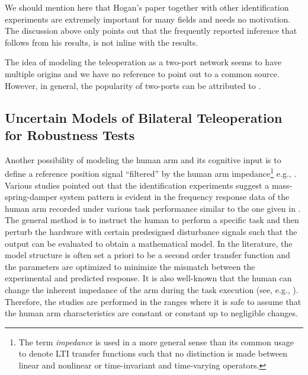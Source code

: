 We should mention here that Hogan's paper together with other identification experiments are extremely important for many
fields and needs no motivation. The discussion above only points out that the frequently reported inference that follows from 
his results, is not inline with the results. 

The idea of modeling the teleoperation as a two-port network seems to have multiple origins and we have no reference to 
point out to a common source. However, in general, the popularity of two-ports can be attributed to 
\cite{andersonspong,nieslotine,rajuphd,hannaford89,yokokohjiyoshikawa}. 



\subsection{Uncertain Models of Bilateral Teleoperation for Robustness Tests}\label{sec:lit:uncmodel}

Another possibility of modeling the human arm and its cognitive input is to define a reference position signal \enquote{filtered} by the 
human arm impedance\footnote{The term \emph{impedance} is used in a more general sense than its common usage to denote
LTI transfer functions such that no distinction is made between linear and nonlinear or time-invariant and time-varying 
operators.} e.g., \cite{leelee,kazeroonitsay}. Various studies pointed out that the identification experiments suggest a 
mass-spring-damper system pattern is evident in the frequency response data of the human arm recorded under various task 
performance similar to the one given in \cite{hogan89}. The general method is to instruct the human to perform a specific 
task and then perturb the hardware with certain predesigned disturbance signals such that the output can be evaluated to obtain 
a mathematical model. In the literature, the model structure is often set a priori to be a second order transfer function and 
the parameters are optimized to minimize the mismatch between the experimental and predicted response. It is also well-known 
that the human can change the inherent impedance of the arm during the task execution (see, e.g., \cite{tsujimorasso}). 
Therefore, the studies are performed in the ranges where it is safe to assume that the human arm characteristics are constant 
or constant up to negligible changes. 


